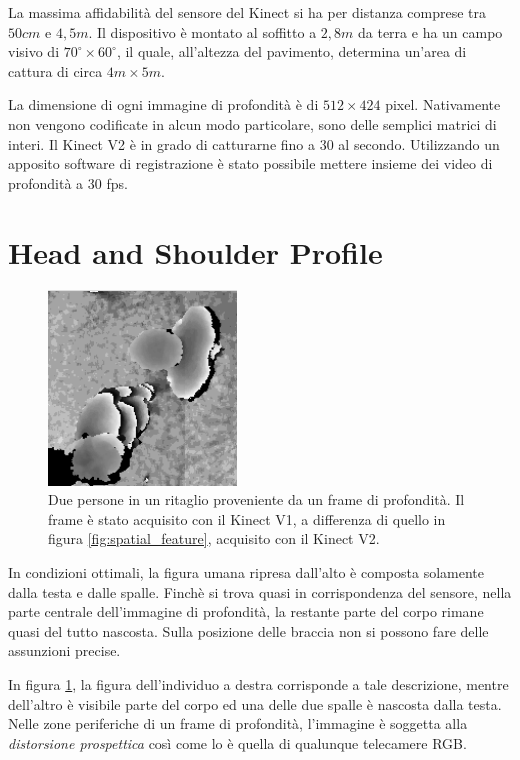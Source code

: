 La massima affidabilità del sensore del Kinect si ha per distanza comprese tra $50cm$ e $4,5m$.
Il dispositivo è montato al soffitto a $2,8m$ da terra e ha un campo visivo di $70^{\circ} \times 60^{\circ}$, il quale, all'altezza del pavimento, determina un'area di cattura di circa $4m \times 5m$.

La dimensione di ogni immagine di profondità è di $512 \times 424$ pixel. Nativamente non vengono codificate in alcun modo particolare, sono delle semplici matrici di interi.
Il Kinect V2 è in grado di catturarne fino a 30 al secondo. Utilizzando un apposito software di registrazione è stato possibile mettere insieme dei video di profondità a 30 fps.


\section{Head and Shoulder Profile}
\label{sec:hasp}

\begin{figure}
    \begin{center}
        \includegraphics[width=5cm]{img/no_occlusion.png}
    \end{center}
    \caption{Due persone in un ritaglio proveniente da un frame di profondità. Il frame è stato acquisito con il Kinect V1, a differenza di quello in figura \ref{fig:spatial_feature}, acquisito con il Kinect V2.}
    \label{fig:no_occlusion}
\end{figure}

In condizioni ottimali, la figura umana ripresa dall'alto è composta solamente dalla testa e dalle spalle.
Finchè si trova quasi in corrispondenza del sensore, nella parte centrale dell'immagine di profondità, la restante parte del corpo rimane quasi del tutto nascosta. Sulla posizione delle braccia non si possono fare delle assunzioni precise.

In figura \ref{fig:no_occlusion}, la figura dell'individuo a destra corrisponde a tale descrizione, mentre dell'altro è visibile parte del corpo ed una delle due spalle è nascosta dalla testa.
Nelle zone periferiche di un frame di profondità, l'immagine è soggetta alla \emph{distorsione prospettica} così come lo è quella di qualunque telecamere RGB.

